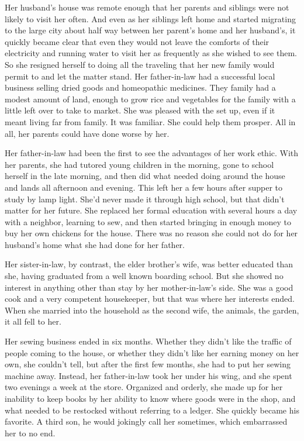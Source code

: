 \documentclass{article}
\begin{document}
Her husband's house was remote enough that her parents and siblings were not likely to visit her often. And even as her siblings left home and started migrating to the large city about half way between her parent's home and her husband's, it quickly became clear that even they would not leave the comforts of their electricity and running water to visit her as frequently as she wished to see them. So she resigned herself to doing all the traveling that her new family would permit to and let the matter stand. Her father-in-law had a successful local business selling dried goods and homeopathic medicines. They family had a modest amount of land, enough to grow rice and vegetables for the family with a little left over to take to market. She was pleased with the set up, even if it meant living far from family. It was familiar. She could help them prosper. All in all, her parents could have done worse by her. 

Her father-in-law had been the first to see the advantages of her work ethic. With her parents, she had tutored young children in the morning, gone to school herself in the late morning, and then did what needed doing around the house and lands all afternoon and evening. This left her a few hours after supper to study by lamp light. She'd never made it through high school, but that didn't matter for her future. She replaced her formal education with several hours a day with a neighbor, learning to sew, and then started bringing in enough money to buy her own chickens for the house. There was no reason she could not do for her husband's home what she had done for her father. 

Her sister-in-law, by contrast, the elder brother's wife, was better educated than she, having graduated from a well known boarding school. But she showed no interest in anything other than stay by her mother-in-law's side. She was a good cook and a very competent housekeeper, but that was where her interests ended. When she married into the household as the second wife, the animals, the garden, it all fell to her.

Her sewing business ended in six months. Whether they didn't like the traffic of people coming to the house, or whether they didn't like her earning money on her own, she couldn't tell, but after the first few months, she had to put her sewing machine away. Instead, her father-in-law took her under his wing, and she spent two evenings a week at the store. Organized and orderly, she made up for her inability to keep books by her ability to know where goods were in the shop, and what needed to be restocked without referring to a ledger. She quickly became his favorite. A third son, he would jokingly call her sometimes, which embarrassed her to no end. 
\end{document}
